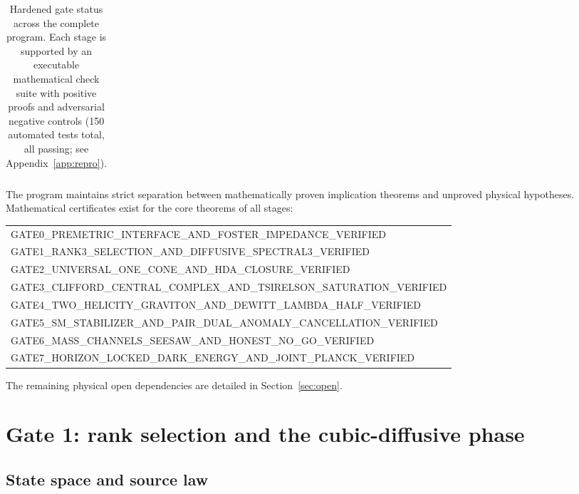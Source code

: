 \documentclass[11pt]{article}
\theoremstyle{definition}
\theoremstyle{remark}
\begin{document}
\begin{table}[ht]
\begin{tabularx}{\textwidth}{@{}c Y Y@{}}
\bottomrule
\end{tabularx}
\caption{Hardened gate status across the complete program. Each stage is supported by an executable mathematical check suite with positive proofs and adversarial negative controls (150 automated tests total, all passing; see Appendix~\ref{app:repro}).}
\label{tab:status}
\end{table}

The program maintains strict separation between mathematically proven implication theorems and unproved physical hypotheses. Mathematical certificates exist for the core theorems of all stages:
\begin{center}\small\ttfamily
\begin{tabular}{@{}l@{}}
GATE0\_PREMETRIC\_INTERFACE\_AND\_FOSTER\_IMPEDANCE\_VERIFIED\\
GATE1\_RANK3\_SELECTION\_AND\_DIFFUSIVE\_SPECTRAL3\_VERIFIED\\
GATE2\_UNIVERSAL\_ONE\_CONE\_AND\_HDA\_CLOSURE\_VERIFIED\\
GATE3\_CLIFFORD\_CENTRAL\_COMPLEX\_AND\_TSIRELSON\_SATURATION\_VERIFIED\\
GATE4\_TWO\_HELICITY\_GRAVITON\_AND\_DEWITT\_LAMBDA\_HALF\_VERIFIED\\
GATE5\_SM\_STABILIZER\_AND\_PAIR\_DUAL\_ANOMALY\_CANCELLATION\_VERIFIED\\
GATE6\_MASS\_CHANNELS\_SEESAW\_AND\_HONEST\_NO\_GO\_VERIFIED\\
GATE7\_HORIZON\_LOCKED\_DARK\_ENERGY\_AND\_JOINT\_PLANCK\_VERIFIED
\end{tabular}
\end{center}
The remaining physical open dependencies are detailed in Section~\ref{sec:open}.

\section{Gate 1: rank selection and the cubic-diffusive phase}
\label{sec:gate1}

\subsection{State space and source law}
\label{sec:state}
\end{document}
